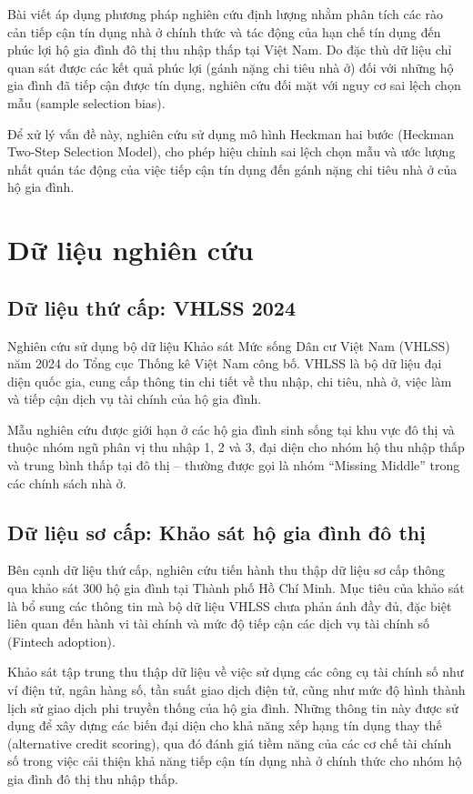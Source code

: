 \documentclass[12pt,a4paper]{report}
\begin{document}
	Bài viết áp dụng phương pháp nghiên cứu định lượng nhằm phân tích các rào cản tiếp cận tín dụng nhà ở chính thức và tác động của hạn chế tín dụng đến phúc lợi hộ gia đình đô thị thu nhập thấp tại Việt Nam. Do đặc thù dữ liệu chỉ quan sát được các kết quả phúc lợi (gánh nặng chi tiêu nhà ở) đối với những hộ gia đình đã tiếp cận được tín dụng, nghiên cứu đối mặt với nguy cơ sai lệch chọn mẫu (sample selection bias).
	
	Để xử lý vấn đề này, nghiên cứu sử dụng mô hình Heckman hai bước (Heckman Two-Step Selection Model), cho phép hiệu chỉnh sai lệch chọn mẫu và ước lượng nhất quán tác động của việc tiếp cận tín dụng đến gánh nặng chi tiêu nhà ở của hộ gia đình.
	
	\section{Dữ liệu nghiên cứu}
	
	\subsection{Dữ liệu thứ cấp: VHLSS 2024}
	
	Nghiên cứu sử dụng bộ dữ liệu Khảo sát Mức sống Dân cư Việt Nam (VHLSS) năm 2024 do Tổng cục Thống kê Việt Nam công bố. VHLSS là bộ dữ liệu đại diện quốc gia, cung cấp thông tin chi tiết về thu nhập, chi tiêu, nhà ở, việc làm và tiếp cận dịch vụ tài chính của hộ gia đình.
	
	Mẫu nghiên cứu được giới hạn ở các hộ gia đình sinh sống tại khu vực đô thị và thuộc nhóm ngũ phân vị thu nhập 1, 2 và 3, đại diện cho nhóm hộ thu nhập thấp và trung bình thấp tại đô thị – thường được gọi là nhóm ``Missing Middle'' trong các chính sách nhà ở.
	
	\subsection{Dữ liệu sơ cấp: Khảo sát hộ gia đình đô thị}
	
	Bên cạnh dữ liệu thứ cấp, nghiên cứu tiến hành thu thập dữ liệu sơ cấp thông qua khảo sát 300 hộ gia đình tại Thành phố Hồ Chí Minh. Mục tiêu của khảo sát là bổ sung các thông tin mà bộ dữ liệu VHLSS chưa phản ánh đầy đủ, đặc biệt liên quan đến hành vi tài chính và mức độ tiếp cận các dịch vụ tài chính số (Fintech adoption).
	
	Khảo sát tập trung thu thập dữ liệu về việc sử dụng các công cụ tài chính số như ví điện tử, ngân hàng số, tần suất giao dịch điện tử, cũng như mức độ hình thành lịch sử giao dịch phi truyền thống của hộ gia đình. Những thông tin này được sử dụng để xây dựng các biến đại diện cho khả năng xếp hạng tín dụng thay thế (alternative credit scoring), qua đó đánh giá tiềm năng của các cơ chế tài chính số trong việc cải thiện khả năng tiếp cận tín dụng nhà ở chính thức cho nhóm hộ gia đình đô thị thu nhập thấp.
	
\end{document}
